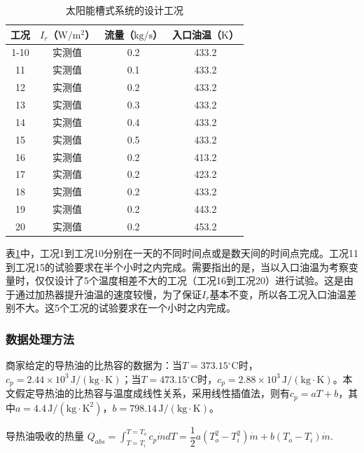 \begin{table}[htbp]\footnotesize
	\caption{太阳能槽式系统的设计工况}
	\begin{center}
	\begin{tabular}{cccc}
		\toprule
		工况	& $I_r$（$\mathrm{W/m^2}$）&	流量（$\mathrm{kg/s}$）			&	入口油温（$\mathrm{K}$）\\
		\midrule
		1-10	&	实测值	&	0.2	&	433.2\\
		11	&	实测值	&	0.1	&	433.2\\
		12	&	实测值	&	0.2	&	433.2\\
		13	&	实测值	&	0.3	&	433.2\\
		14	&	实测值	&	0.4	&	433.2\\
		15	&	实测值	&	0.5	&	433.2\\
		16	&	实测值	&	0.2	&	413.2\\
		17	&	实测值	&	0.2	&	423.2\\
		18	&	实测值	&	0.2	&	433.2\\
		19	&	实测值	&	0.2	&	443.2\\
		20	&	实测值	&	0.2	&	453.2\\
		\bottomrule
	\end{tabular}
	\end{center}
	\label{tab:DesignedCasesForTrough}
\end{table}

表\ref{tab:DesignedCasesForTrough}中，工况1到工况10分别在一天的不同时间点或是数天间的时间点完成。工况11到工况15的试验要求在半个小时之内完成。需要指出的是，当以入口油温为考察变量时，仅仅设计了5个温度相差不大的工况（工况16到工况20）进行试验。这是由于通过加热器提升油温的速度较慢，为了保证$I_r$基本不变，所以各工况入口油温差别不大。这5个工况的试验要求在一个小时之内完成。

\subsubsection{数据处理方法}
商家给定的导热油的比热容的数据为：当$T = 373.15\mathrm{^\circ C}$时，$c_p = 2.44\times10^3\,\mathrm{J/(kg\cdot K)}$；当$T = 473.15\mathrm{^\circ C}$时，$c_p = 2.88\times10^3\,\mathrm{J/(kg\cdot K)}$。本文假定导热油的比热容与温度成线性关系，采用线性插值法，则有$c_p = aT + b$，其中$a = 4.4\,\mathrm{J/(kg \cdot K^2)}$，$b = 798.14\,\mathrm{J/(kg\cdot K)}$。

导热油吸收的热量 $Q_{abs} = \int_{T=T_i}^{T = T_o}c_p\dot{m}dT = \dfrac{1}{2}a(T_o^2 - T_i^2)\dot{m} + b (T_o - T_i)\dot{m}$.

